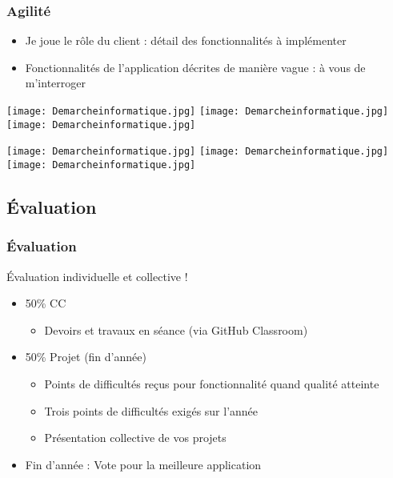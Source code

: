 \documentclass[english, french]{beamer}
\begin{document}
	\newlength{\agTotHeight}
	\newlength{\agTotWidth}
	\newlength{\agTopHalf}
	\setlength{\agTopHalf}{\agTotHeight / 2 + 1mm}
	\newlength{\agBottomHalf}
	\setlength{\agBottomHalf}{\agTotHeight / 2 + 1mm}
	\newlength{\agPanelWidth}
	\setlength{\agPanelWidth}{\agTotWidth / 3}
	\newlength{\agWidth}
	\setlength{\agWidth}{3.0cm - 1pt}
	\newlength{\agTopCrop}
	\setlength{\agTopCrop}{3mm}
	\newlength{\agBottomCrop}
	\setlength{\agBottomCrop}{6mm}
\begin{frame}
	\frametitle{Agilité}
	\begin{itemize}
		\item Je joue le rôle du client : détail des fonctionnalités à implémenter
		\item Fonctionnalités de l’application décrites de manière vague : à vous de m’interroger
	\end{itemize}
	\begin{center}
		\texttt{[image: Demarcheinformatique.jpg]}%
		\texttt{[image: Demarcheinformatique.jpg]}%
		\texttt{[image: Demarcheinformatique.jpg]}%
			
		\texttt{[image: Demarcheinformatique.jpg]}%
		\texttt{[image: Demarcheinformatique.jpg]}%
		\texttt{[image: Demarcheinformatique.jpg]}%
	\end{center}
\end{frame}

\subsection{Évaluation}
\begin{frame}
	\frametitle{Évaluation}
	 Évaluation individuelle et collective !
	\begin{itemize}
		\item 50\% CC
		\begin{itemize}
			\item Devoirs et travaux en séance (via GitHub Classroom)
		\end{itemize}
		\item 50\% Projet (fin d’année)
		\begin{itemize}
			\item Points de difficultés reçus pour fonctionnalité quand qualité atteinte
			\item Trois points de difficultés exigés sur l’année
			\item Présentation collective de vos projets
		\end{itemize}
		\item Fin d’année : Vote pour la meilleure application
	\end{itemize}
\end{frame}
\end{document}
